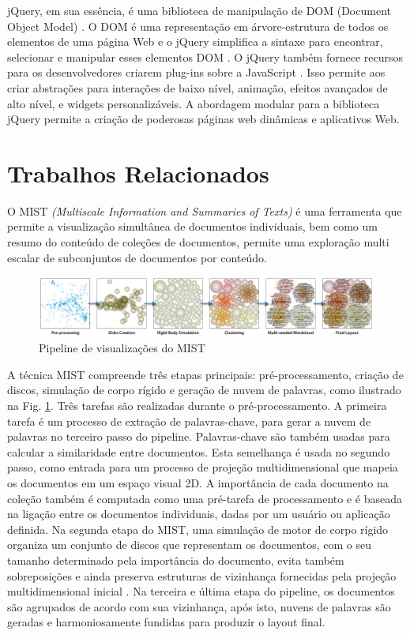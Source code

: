jQuery, em sua essência, é uma biblioteca de manipulação de DOM (Document Object Model) \cite{duckett2014web}. O DOM é uma representação em árvore-estrutura de todos os elementos de uma página Web e o jQuery simplifica a sintaxe para encontrar, selecionar e manipular esses elementos DOM \cite{bibeault2008jquery}. O jQuery também fornece recursos para os desenvolvedores criarem plug-ins sobre a JavaScript \cite{duckett2014web}. Isso permite aos criar abstrações para interações de baixo nível, animação, efeitos avançados de alto nível, e widgets personalizáveis. A abordagem modular para a biblioteca jQuery permite a criação de poderosas páginas web dinâmicas e aplicativos Web.




\section{Trabalhos Relacionados}
\label{Trab_Relac}


O MIST \textit{(Multiscale Information and Summaries of Texts)} é uma ferramenta que permite a visualização simultânea de documentos individuais, bem como um resumo do conteúdo de coleções de documentos, permite uma exploração multi escalar de subconjuntos de documentos por conteúdo\cite{pagliosa2013mist}. 


\begin{figure}[!ht]
	\centering
	\includegraphics[width=1\columnwidth]{images/mist_pipeline.png}
	\caption{Pipeline de visualizações do MIST \cite{pagliosa2013mist}}
	\label{fig:MISTpipeline}
\end{figure}

A técnica MIST compreende três etapas principais: pré-processamento, criação de discos, simulação de corpo rígido e geração de nuvem de palavras, como ilustrado na Fig. \ref{fig:MISTpipeline}. Três tarefas são realizadas durante o pré-processamento. A primeira tarefa é um processo de extração de palavras-chave, para gerar a nuvem de palavras no terceiro passo do pipeline. Palavras-chave são também usadas para calcular a similaridade entre documentos. Esta semelhança é usada no segundo passo, como entrada para um processo de projeção multidimensional que mapeia os documentos em um espaço visual 2D. A importância de cada documento na coleção também é computada como uma pré-tarefa de processamento e é baseada na ligação entre os documentos individuais, dadas por um usuário ou aplicação definida. Na segunda etapa do MIST, uma simulação de motor de corpo rígido  organiza um conjunto de discos que representam os documentos, com o seu tamanho determinado pela importância do documento, evita também sobreposições e ainda preserva estruturas de vizinhança fornecidas pela projeção multidimensional inicial \cite{pagliosa2013mist}.
Na terceira e última etapa do pipeline, os documentos são agrupados de acordo com sua vizinhança, após isto, nuvens de palavras são geradas e harmoniosamente fundidas para produzir o layout final.

